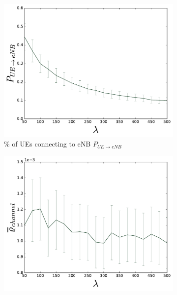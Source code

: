 \begin{figure}[H]
  \begin{subfigure}[b]{0.5\linewidth}
    \centering
    \captionsetup{justification=centering}
    \includegraphics[width=1\linewidth]{figures/COMPLETE_2} 
    \caption{\% of UEs connecting to eNB $P_{UE\rightarrow eNB}$ }
    \label{fig:COMPLETE_2} 
    \vspace{4ex}
  \end{subfigure}%
  \begin{subfigure}[b]{0.5\linewidth}
    \centering
    \captionsetup{justification=centering}
    \includegraphics[width=1\linewidth]{figures/COMPLETE_8} 

\end{subfigure}
\end{figure}
